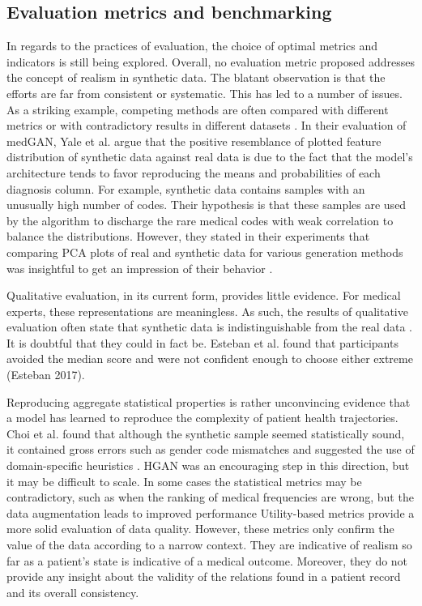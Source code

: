 \subsection{Evaluation metrics and benchmarking}
In regards to the practices of evaluation, the choice of optimal metrics and indicators is still being explored. Overall, no evaluation metric proposed addresses the concept of realism in synthetic data. The blatant observation is that the efforts are far from consistent or systematic. This has led to a number of issues. As a striking example, competing methods are often compared with different metrics or with contradictory results in different datasets \cite{baowaly_2019_IEEE,baowaly_2019_jamia,Camino2018-re,Choi2017-nt,Zhang2020}. In their evaluation of medGAN, Yale et al. argue that the positive resemblance of plotted feature distribution of synthetic data against real data is due to the fact that the model's architecture tends to favor reproducing the means and probabilities of each diagnosis column. For example, synthetic data contains samples with an unusually high number of codes. Their hypothesis is that these samples are used by the algorithm to discharge the rare medical codes with weak correlation to balance the distributions. However, they stated in their experiments that comparing PCA plots of real and synthetic data for various generation methods was insightful to get an impression of their behavior \cite{Yale_2020}.\par
Qualitative evaluation, in its current form, provides little evidence. For medical experts, these representations are meaningless. As such, the results of qualitative evaluation often state that synthetic data is indistinguishable from the real data \cite{Choi2017-nt,Wang_2019}. It is doubtful that they could in fact be. Esteban et al. found that participants avoided the median score and were not confident enough to choose either extreme (Esteban 2017).\par
Reproducing aggregate statistical properties is rather unconvincing evidence that a model has learned to reproduce the complexity of patient health trajectories. Choi et al. found that although the synthetic sample seemed statistically sound, it contained gross errors such as gender code mismatches and suggested the use of domain-specific heuristics \cite{Choi2017-nt}. HGAN was an encouraging step in this direction, but it may be difficult to scale. In some cases the statistical metrics may be contradictory, such as when the ranking of medical frequencies are wrong, but the data augmentation leads to improved performance \cite{Che_2017}
Utility-based metrics provide a more solid evaluation of data quality. However, these metrics only confirm the value of the data according to a narrow context. They are indicative of realism so far as a patient's state is indicative of a medical outcome. Moreover, they do not provide any insight about the validity of the relations found in a patient record and its overall consistency. 

